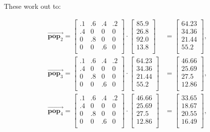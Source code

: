 \smallskip
These work out to:

\vspace{-.15in}
\begin{align*}
\overrightarrow{\textbf{pop}_2} =
\begin{bmatrix}
.1 & .6 & .4 & .2 \\
.4 & 0 & 0 & 0 \\
0 & .8 & 0 & 0 \\
0 & 0 & .6 & 0 \\
\end{bmatrix} \cdot
\begin{bmatrix}
85.9 \\ 26.8 \\ 92.0 \\ 13.8 \\
\end{bmatrix} &=
\begin{bmatrix}
64.23 \\ 34.36 \\ 21.44 \\ 55.2 \\
\end{bmatrix}, \\
\overrightarrow{\textbf{pop}_3} =
\begin{bmatrix}
.1 & .6 & .4 & .2 \\
.4 & 0 & 0 & 0 \\
0 & .8 & 0 & 0 \\
0 & 0 & .6 & 0 \\
\end{bmatrix} \cdot
\begin{bmatrix}
64.23 \\ 34.36 \\ 21.44 \\ 55.2 \\
\end{bmatrix} &=
\begin{bmatrix}
46.66 \\ 25.69 \\ 27.5 \\ 12.86 \\
\end{bmatrix}, \\
\overrightarrow{\textbf{pop}_4} =
\begin{bmatrix}
.1 & .6 & .4 & .2 \\
.4 & 0 & 0 & 0 \\
0 & .8 & 0 & 0 \\
0 & 0 & .6 & 0 \\
\end{bmatrix} \cdot
\begin{bmatrix}
46.66 \\ 25.69 \\ 27.5 \\ 12.86 \\
\end{bmatrix} &=
\begin{bmatrix}
33.65 \\ 18.67 \\ 20.55 \\ 16.49 \\
\end{bmatrix},
\end{align*}
